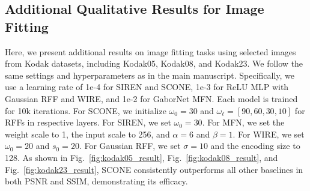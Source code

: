 \documentclass[letterpaper]{article} %
\begin{document}
\subsection{Additional Qualitative Results for Image Fitting}
Here, we present additional results on image fitting tasks using selected images from Kodak datasets, including Kodak05, Kodak08, and Kodak23. We follow the same settings and hyperparameters as in the main manuscript. Specifically, we use a learning rate of 1e-4 for SIREN and SCONE, 1e-3 for ReLU MLP with Gaussian RFF and WIRE, and 1e-2 for GaborNet MFN. Each model is trained for 10k iterations. For SCONE, we initialize $\omega_0 = 30$ and $\omega_{\ell} = [90, 60, 30, 10]$ for RFFs in respective layers. For SIREN, we set $\omega_0 = 30$. For MFN, we set the weight scale to 1, the input scale to 256, and $\alpha=6$ and $\beta=1$. For WIRE, we set $\omega_0 = 20$ and $s_0 = 20$. For Gaussian RFF, we set $\sigma=10$ and the encoding size to 128. As shown in Fig.~\ref{fig:kodak05_result}, Fig.~\ref{fig:kodak08_result}, and Fig.~\ref{fig:kodak23_result}, SCONE consistently outperforms all other baselines in both PSNR and SSIM, demonstrating its efficacy.
\end{document}
